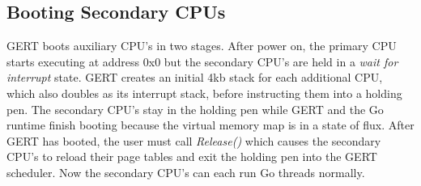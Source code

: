 \subsection{Booting Secondary CPUs}

GERT boots auxiliary CPU's in two stages. After power on, the primary CPU starts executing at address 0x0 but the
secondary CPU's are held in a \textit{wait for interrupt} state. GERT creates an initial 4kb stack for each additional CPU,
which also doubles as its interrupt stack, before instructing them into a holding pen. The secondary CPU's
stay in the holding pen while GERT and the Go runtime finish booting because the virtual memory map is
in a state of flux. After GERT has booted, the user must call \textit{Release()} which causes the secondary CPU's
to reload their page tables and exit the holding pen into the GERT scheduler. Now the secondary CPU's
can each run Go threads normally.


